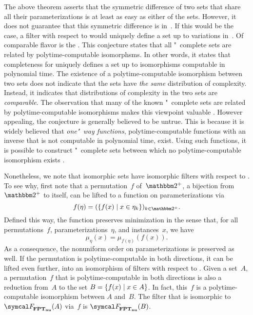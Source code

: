 The above theorem asserts that the symmetric difference of two sets that share all their parameterizations is at least as easy as either of the sets.
However, it does not guarantee that this symmetric difference is in~.
If this would be the case, a filter with respect to  would uniquely define a set up to variations in~.
Of comparable flavor is the  \parencite{berman1977isomorphisms}.
This conjecture states that all "~complete sets are related by polytime-computable isomorphsms.
In other words, it states that completeness for  uniquely defines a set up to isomorphisms computable in polynomial time.
The existence of a polytime-computable isomorphism between two sets does not indicate that the sets have \emph{the same} distribution of complexity.
Instead, it indicates that distributions of complexity in the two sets are \emph{comparable}.
The observation that many of the known "~complete sets are related by polytime-computable isomorphisms makes this viewpoint valuable \parencite{berman1977isomorphisms,goldsmith1996scalability}.
However appealing, the conjecture is generally believed to be untrue.
This is because it is widely believed that \emph{one"~way functions}, polytime-computable functions with an inverse that is not computable in polynomial time, exist.
Using such functions, it is possible to construct "~complete sets between which no polytime-computable isomorphism exists \parencite{young1983some,agrawal2009one}.

Nonetheless, we note that isomorphic sets have isomorphic filters with respect to .
To see why, first note that a permutation~$f$ of~$\binary^+$, a bijection from $\binary^+$ to itself, can be lifted to a function on parameterizations via
\begin{equation*}
  f(\eta) = (\{f(x) \st x \in \eta_k\})_{k \in \binary^+}.
\end{equation*}
Defined this way, the function preserves minimization in the sense that, for all permutations~$f$, parameterizations~$\eta$, and instances~$x$, we have
\begin{equation*}
  \mu_\eta(x) = \mu_{f(\eta)}(f(x)).
\end{equation*}
As a consequence, the nonuniform order on parameterizations is preserved as well.
If the permutation is polytime-computable in both directions, it can be lifted even further, into an isomorphism of filters with respect to .
Given a set~$A$, a permutation~$f$ that is polytime-computable in both directions is also a reduction from~$A$ to the set $B = \{f(x) \;|\; x \in A\}$.
In fact, this~$f$ is a polytime-computable isomorphism between $A$ and~$B$.
The filter that is isomorphic to $\calF_\clnu{FPT}(A)$ via~$f$ is $\calF_\clnu{FPT}(B)$.

